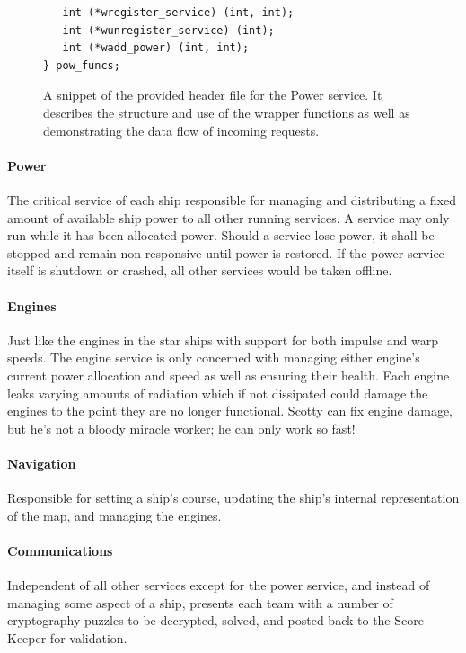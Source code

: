 \documentclass[10pt]{article}
\begin{document}
\begin{figure}[here!]
\begin{verbatim}
   int (*wregister_service) (int, int);
   int (*wunregister_service) (int);
   int (*wadd_power) (int, int);
} pow_funcs;
\end{verbatim}
\caption{A snippet of the provided header file for the Power service. It
describes the structure and use of the wrapper functions as well as
demonstrating the data flow of incoming requests.}
\label{fig:wraperStructEx}
\end{figure}

\paragraph*{Power} The critical service of each ship responsible for managing
and distributing a fixed amount of available ship power to all other running
services. A service may only run while it has been allocated power. Should a
service lose power, it shall be stopped and remain non-responsive until power is
restored. If the power service itself is shutdown or crashed, all other
services would be taken offline.

\paragraph*{Engines} Just like the engines in the star ships with support for
both impulse and warp speeds. The engine service is only concerned with
managing either engine's current power allocation and speed as well as ensuring
their health. Each engine leaks varying amounts of radiation which if not
dissipated could damage the engines to the point they are no longer functional.
Scotty can fix engine damage, but he's not a bloody miracle worker; he can only
work so fast!

\paragraph*{Navigation} Responsible for setting a ship's course, updating the
ship's internal representation of the map, and managing the engines.

\paragraph*{Communications} Independent of all other services except for the
power service, and instead of managing some aspect of a ship, presents each team
with a number of cryptography puzzles to be decrypted, solved, and posted back
to the Score Keeper for validation.
\end{document}
